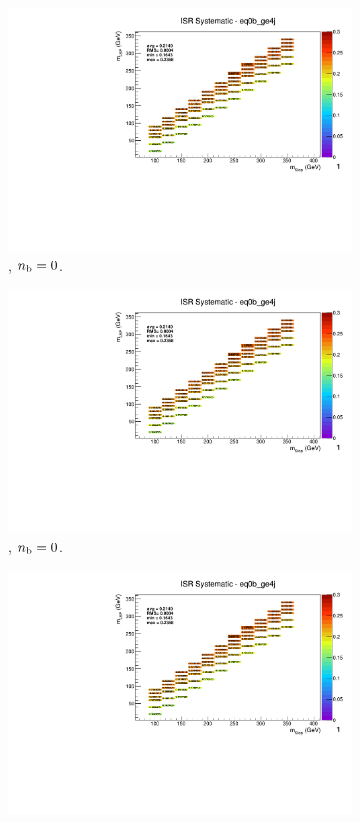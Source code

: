\begin{figure}[ht!]
\begin{subfigure}[b]{0.32\textwidth}
    \includegraphics[width=\textwidth, page=12]{Figs/sms/t2cc/v37/systs/T2cc_ISR_eq0b_ge4j.pdf}
    \caption{\njhigh, $n_{\text{b}} = 0$.}
  \end{subfigure}
  \begin{subfigure}[b]{0.32\textwidth}
    \includegraphics[width=\textwidth, page=8]{Figs/sms/t2cc/v37/systs/T2cc_ISR_eq0b_ge4j.pdf}
    \caption{\njhigh, $n_{\text{b}} = 0$.}
  \end{subfigure}
  \begin{subfigure}[b]{0.32\textwidth}
    \includegraphics[width=\textwidth, page=1]{Figs/sms/t2cc/v37/systs/T2cc_ISR_eq0b_ge4j.pdf}

\end{subfigure}
\end{figure}
